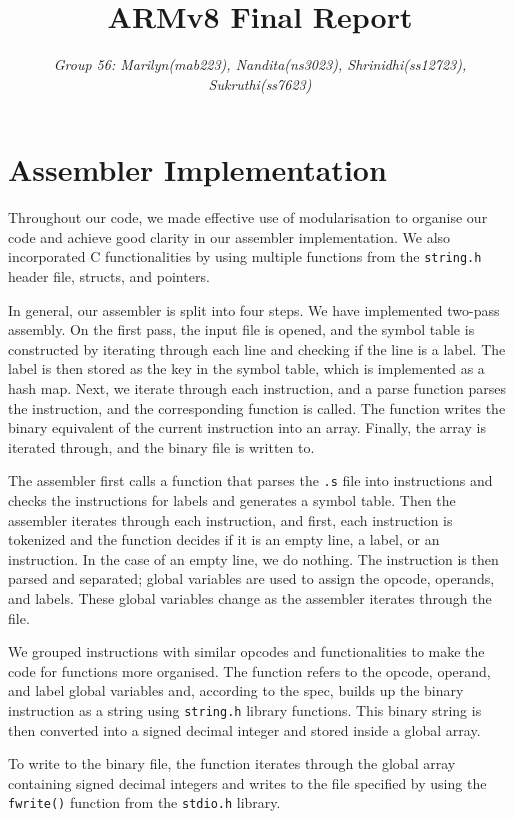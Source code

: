 \documentclass[11pt]{article}
\title{ARMv8 Final Report}
\author{\emph{Group 56: Marilyn(mab223), Nandita(ns3023), Shrinidhi(ss12723), Sukruthi(ss7623)}}
\begin{document}
\maketitle

\section{Assembler Implementation}

Throughout our code, we made effective use of modularisation to organise our code and achieve good clarity in our assembler implementation. We also incorporated C functionalities by using multiple functions from the \texttt{string.h} header file, structs, and pointers.

In general, our assembler is split into four steps. We have implemented two-pass assembly. On the first pass, the input file is opened, and the symbol table is constructed by iterating through each line and checking if the line is a label. The label is then stored as the key in the symbol table, which is implemented as a hash map. Next, we iterate through each instruction, and a parse function parses the instruction, and the corresponding function is called. The function writes the binary equivalent of the current instruction into an array. Finally, the array is iterated through, and the binary file is written to.

The assembler first calls a function that parses the \texttt{.s} file into instructions and checks the instructions for labels and generates a symbol table. Then the assembler iterates through each instruction, and first, each instruction is tokenized and the function decides if it is an empty line, a label, or an instruction. In the case of an empty line, we do nothing. The instruction is then parsed and separated; global variables are used to assign the opcode, operands, and labels. These global variables change as the assembler iterates through the file.

We grouped instructions with similar opcodes and functionalities to make the code for functions more organised. The function refers to the opcode, operand, and label global variables and, according to the spec, builds up the binary instruction as a string using \texttt{string.h} library functions. This binary string is then converted into a signed decimal integer and stored inside a global array.

To write to the binary file, the function iterates through the global array containing signed decimal integers and writes to the file specified by using the \texttt{fwrite()} function from the \texttt{stdio.h} library.
\end{document}
